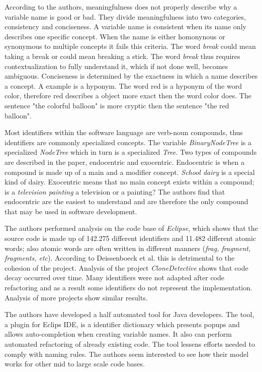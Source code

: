 \documentclass[a4paper,12pt]{article}
\begin{document}
\begin{multicols}{2}
According to the authors, meaningfulness does not properly describe why a variable name is good or bad. They divide meaningfulness into two categories, consistency and conciseness. A variable name is consistent when its name only describes one specific concept. When the name is either homonynous or synonymous to multiple concepts it fails this criteria. The word \textit{break} could mean taking a break or could mean breaking a stick. The word \textit{break} thus requires contextualization to fully understand it, which if not done well, becomes ambiguous. Conciseness is determined by the exactness in which a name describes a concept. A example is a hyponym. The word red is a hyponym of the word color, therefore red describes a object more exact then the word color does. The sentence "the colorful balloon" is more cryptic then the sentence "the red balloon".

Most identifiers within the software language are verb-noun compounds, thus identifiers are commonly specialized concepts. The variable \textit{BinaryNodeTree} is a specialized \textit{NodeTree} which in turn is a specialized \textit{Tree}. Two types of compounds are described in the paper, endocentric and exocentric. Endocentric is when a compound is made up of a main and a modifier concept. \textit{School dairy} is a special kind of dairy. Exocentric means that no main concept exists within a compound; is a \textit{television painting} a television or a painting? The authors find that endocentric are the easiest to understand and are therefore the only compound that may be used in software development.

The authors performed analysis on the code base of \textit{Eclipse}, which shows that the source code is made up of 142.275 different identifiers and 11.482 different atomic words; also atomic words are often written in different manners (\textit{frag, fragment, fragments, etc}). According to Deissenboeck et al. this is detrimental to the cohesion of the project. Analysis of the project \textit{CloneDetective} shows that code decay occurred over time. Many identifiers were not adapted after code refactoring and as a result some identifiers do not represent the implementation. Analysis of more projects show similar results.

The authors have developed a half automated tool for Java developers. The tool, a plugin for Eclips IDE, is a identifier dictionary which presents popups and allows auto-completion when creating variable names. It also can perform automated refactoring of already existing code. The tool lessens efforts needed to comply with naming rules. The authors seem interested to see how their model works for other mid to large scale code bases.


\end{multicols}
\end{document}
